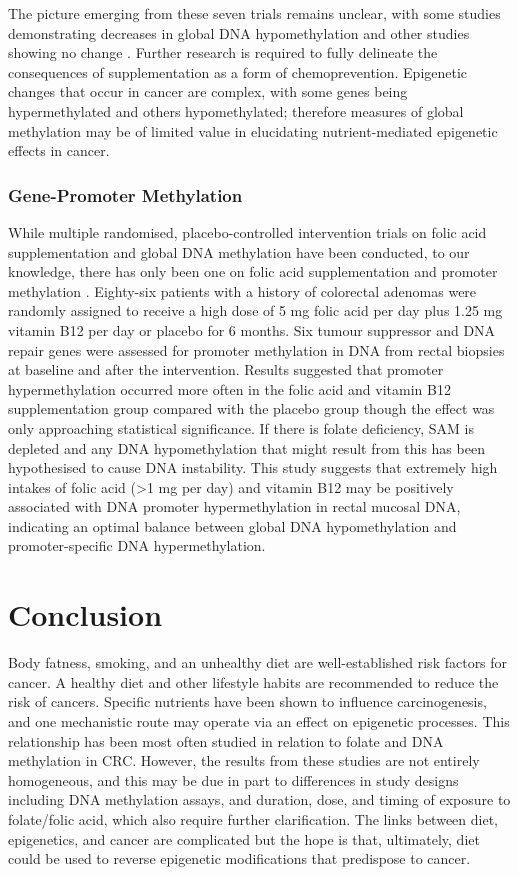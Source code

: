 \noindent The picture emerging from these seven trials remains unclear, with some studies demonstrating decreases in global DNA hypomethylation \cite{c254,c256} and other studies showing no change \cite{c251,c252,c257}. Further research is required to fully delineate the consequences of supplementation as a form of chemoprevention. Epigenetic changes that occur in cancer are complex, with some genes being hypermethylated and others hypomethylated; therefore measures of global methylation may be of limited value in elucidating nutrient-mediated epigenetic effects in cancer. 
 
\subsubsection{Gene-Promoter Methylation} %
\noindent While multiple randomised, placebo-controlled intervention trials on folic acid supplementation and global DNA methylation have been conducted, to our knowledge, there has only been one on folic acid supplementation and promoter methylation \cite{c258}. Eighty-six patients with a history of colorectal adenomas were randomly assigned to receive a high dose of 5 mg folic acid per day plus 1.25 mg vitamin B12 per day or placebo for 6 months. Six tumour suppressor and DNA repair genes were assessed for promoter methylation in DNA from rectal biopsies at baseline and after the intervention. Results suggested that promoter hypermethylation occurred more often in the folic acid and vitamin B12 supplementation group compared with the placebo group though the effect was only approaching statistical significance. If there is folate deficiency, SAM is depleted and any DNA hypomethylation that might result from this has been hypothesised to cause DNA instability. This study suggests that extremely high intakes of folic acid (>1 mg per day) and vitamin B12 may be positively associated with DNA promoter hypermethylation in rectal mucosal DNA, indicating an optimal balance between global DNA hypomethylation and promoter-specific DNA hypermethylation.

\section[]{Conclusion} %
\noindent Body fatness, smoking, and an unhealthy diet are well-established risk factors for cancer. A healthy diet and other lifestyle habits are recommended to reduce the risk of cancers. Specific nutrients have been shown to influence carcinogenesis, and one mechanistic route may operate via an effect on epigenetic processes. This relationship has been most often studied in relation to folate and DNA methylation in CRC. However, the results from these studies are not entirely homogeneous, and this may be due in part to differences in study designs including DNA methylation assays, and duration, dose, and timing of exposure to folate/folic acid, which also require further clarification. The links between diet, epigenetics, and cancer are complicated but the hope is that, ultimately, diet could be used to reverse epigenetic modifications that predispose to cancer.

